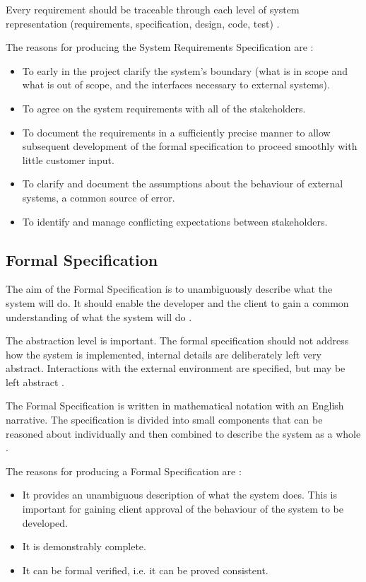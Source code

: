Every requirement should be traceable through each level of system representation (requirements, specification, design, code, test) \parencite{Tokeneer}.

The reasons for producing the System Requirements Specification are \parencite{Tokeneer}:
\begin{itemize}
	\item To early in the project clarify the system's boundary (what is in scope 
		and what is out of scope, and the interfaces necessary to external systems).
	\item To agree on the system requirements with all of the stakeholders.
	\item To document the requirements in a sufficiently precise manner to allow 
		subsequent development of the formal specification to proceed smoothly with 
		little customer input.
	\item To clarify and document the assumptions about the behaviour of external 
		systems, a common source of error.
	\item To identify and manage conflicting expectations between stakeholders.
\end{itemize}

\subsection{Formal Specification}

The aim of the Formal Specification is to unambiguously describe what the system
will do. It should enable the developer and the client to gain a common
understanding of what the system will do \parencite{Tokeneer}.

The abstraction level is important. The formal specification should not address 
how the system is implemented, internal details are deliberately left very abstract. 
Interactions with the external environment are specified, but may be left abstract \parencite{Tokeneer}.

The Formal Specification is written in mathematical notation with an English 
narrative. The specification is divided into small components that can be reasoned
about individually and then combined to describe the system as a whole \parencite{Tokeneer}.

The reasons for producing a Formal Specification are \parencite{Tokeneer}:
\begin{itemize}
	\item It provides an unambiguous description of what the system does. This is
		important for gaining client approval of the behaviour of the system to be
		developed.
	\item It is demonstrably complete.
	\item It can be formal verified, i.e. it can be proved consistent.
\end{itemize}

